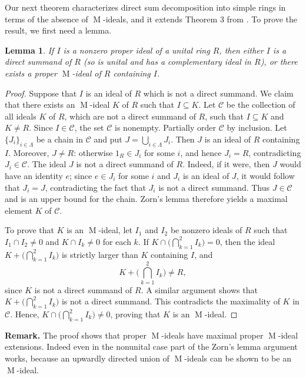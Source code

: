 \documentclass[11pt,leqno]{amsart}
\DeclareMathOperator{\m}{M}
\newtheorem{lemma}[theorem]{Lemma}
\theoremstyle{definition}
\theoremstyle{remark}
\numberwithin{equation}{section}
\numberwithin{equation}{section}
\begin{document}
Our next theorem characterizes  direct sum
decomposition into  simple rings in terms of the absence of $\m$-ideals, and it extends Theorem 3 from \cite{OJ81}. To prove the result, we first need a lemma.

\begin{lemma}
\label{fl1}
If \( I \) is a nonzero proper ideal of a unital ring \( R \), then either \( I \) is a direct summand of \( R \) (so is unital and has a complementary ideal in $R$), or there exists a proper \( \m \)-ideal of \( R \) containing \( I \).
\end{lemma}

\begin{proof}
Suppose that \( I \) is 
an ideal of \( R \) which is not a direct summand.
We claim that there exists an \( \m \)-ideal \( K \) of \( R \) such that \( I \subseteq K \).
Let \( \mathcal{C} \) be the collection of all ideals \( K \) of \( R \), which are not a direct summand of $R$, such that \( I \subseteq K \) and \( K \neq R \).  Since $I\in \mathcal{C}$, the set $\mathcal{C}$ is nonempty.
Partially order $\mathcal{C}$ by inclusion. Let $\{J_i\}_{i\in\Lambda}$ be a chain in $\mathcal{C}$ and put $J=\bigcup_{i\in\Lambda}J_i$. Then $J$ is an ideal of $R$ containing $I$. Moreover, $J\neq R$: otherwise $1_R\in J_i$ for some $i$, and hence $J_i=R$, contradicting $J_i\in\mathcal{C}$. The ideal $J$ is not a direct summand of $R$. Indeed, if it were, then $J$ would have an identity $e$; since $e\in J_i$ for some $i$ and $J_i$ is an ideal of $J$, it would follow that $J_i=J$, contradicting the fact that $J_i$ is not a direct summand. Thus $J\in\mathcal{C}$ and is an upper bound for the chain. Zorn's lemma therefore yields a maximal element $K$ of $\mathcal{C}$.

To prove that \( K \) is an \( \m \)-ideal, let \( I_1\) and \(I_2\) be nonzero ideals of \( R \) such that \(  I_1\cap I_2 \neq 0 \) and \( K \cap I_k \neq 0 \) for each \( k \).
If \( K \cap \big(\bigcap_{k=1}^2 I_k\big) = 0 \), then the ideal \( K + \big(\bigcap_{k=1}^2 I_k\big) \) is strictly larger than \( K \) containing \( I \), and \[ K + \big(\bigcap_{k=1}^2 I_k\big) \neq R,\] since $K$ is not a direct summand of $R$. A similar argument shows that \( K + \big(\bigcap_{k=1}^2 I_k\big) \) is not a direct summand.  This contradicts the maximality of \( K \) in \( \mathcal{C} \).
Hence, \( K \cap \big(\bigcap_{k=1}^2 I_k\big) \neq 0 \), proving that \( K \) is an \( \m \)-ideal.
\end{proof}

{\bf Remark.}  The proof shows that proper \( \m \)-ideals have maximal proper \( \m \)-ideal extensions.
 Indeed even in the nonunital case part of the Zorn's lemma argument works, because an upwardly directed union of  \( \m \)-ideals can be shown to be an \( \m \)-ideal.
\end{document}
